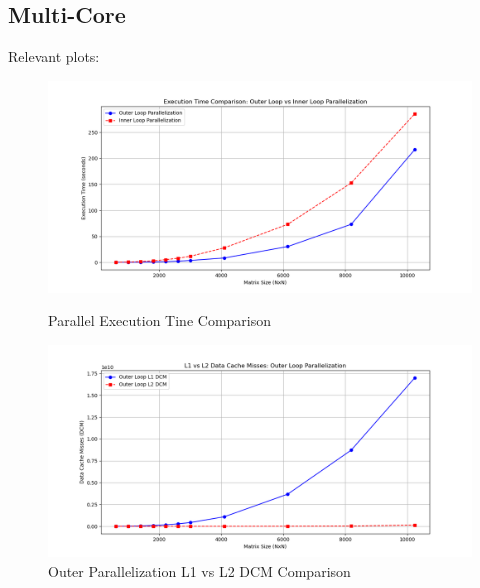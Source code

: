 \documentclass{article}
\begin{document}
\subsection{Multi-Core}

Relevant plots:

\begin{figure}[H]
    \centering
    \begin{minipage}{0.48\textwidth} %
        \centering
        \includegraphics[width=\textwidth]{Figure_7.png} %
        \caption{\small Parallel Execution Tine Comparison}
        \label{fig:execution_time_parallel}
    \end{minipage}
    \hfill
    \begin{minipage}{0.48\textwidth} %
        \centering
        \includegraphics[width=\textwidth]{Figure_8.png} %
        \caption{\small Outer Parallelization L1 vs L2 DCM Comparison}
        \label{fig:cache_misses_parallel1}
    \end{minipage}
    \vspace{0.5cm} %


\end{figure}
\end{document}
